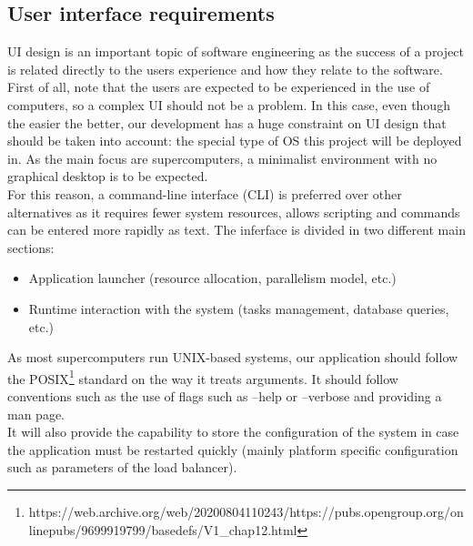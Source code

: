 \subsection{User interface requirements}

UI design is an important topic of software engineering as the success of a
project is related directly to the users experience and how they relate to the
software.\\

First of all, note that the users are expected to be experienced in the use of
computers, so a complex UI should not be a problem. In this case, even though
the easier the better, our development has a huge constraint on UI design that
should be taken into account: the special type of OS this project
will be deployed in. As the main focus are supercomputers, a minimalist environment
with no graphical desktop is to be expected.\\

For this reason, a command-line interface (CLI) is preferred over other alternatives as it requires fewer system resources, allows scripting and commands can be entered more rapidly as text.
The inferface is divided in two different  main sections:\\
\begin{itemize}
  \item Application launcher (resource allocation, parallelism model, etc.)
  \item Runtime interaction with the system (tasks management, database
  queries, etc.)
\end{itemize}

As most supercomputers run UNIX-based systems, our application should follow
the POSIX\footnote{https://web.archive.org/web/20200804110243/https://pubs.opengroup.org/onlinepubs/9699919799/basedefs/V1_chap12.html} standard on the way it treats arguments.
It should follow conventions such as the use of flags such as --help or
--verbose and providing a man page.\\

It will also provide the capability to store the configuration of the system in case
the application must be restarted quickly (mainly platform specific
configuration such as parameters of the load balancer). \\

